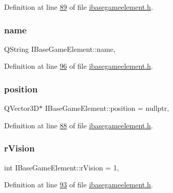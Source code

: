 Definition at line \hyperlink{a00047_source_l00089}{89} of file \hyperlink{a00047_source}{ibasegameelement.\+h}.

\mbox{\label{a00137_af35fba4ed599605c3d78b3c3a71fa467}} 
\subsubsection{\texorpdfstring{name}{name}}
{\footnotesize\ttfamily Q\+String I\+Base\+Game\+Element\+::name\hspace{0.3cm}{\ttfamily [protected]}, {\ttfamily [inherited]}}



Definition at line \hyperlink{a00047_source_l00096}{96} of file \hyperlink{a00047_source}{ibasegameelement.\+h}.

\mbox{\label{a00137_afe080b1942ec40832e94cb884ec87456}} 
\subsubsection{\texorpdfstring{position}{position}}
{\footnotesize\ttfamily Q\+Vector3D$\ast$ I\+Base\+Game\+Element\+::position = nullptr\hspace{0.3cm}{\ttfamily [protected]}, {\ttfamily [inherited]}}



Definition at line \hyperlink{a00047_source_l00088}{88} of file \hyperlink{a00047_source}{ibasegameelement.\+h}.

\mbox{\label{a00137_ae0ad3c240950eba352aeb04e6a9296b4}} 
\subsubsection{\texorpdfstring{r\+Vision}{rVision}}
{\footnotesize\ttfamily int I\+Base\+Game\+Element\+::r\+Vision = 1\hspace{0.3cm}{\ttfamily [protected]}, {\ttfamily [inherited]}}



Definition at line \hyperlink{a00047_source_l00093}{93} of file \hyperlink{a00047_source}{ibasegameelement.\+h}.

